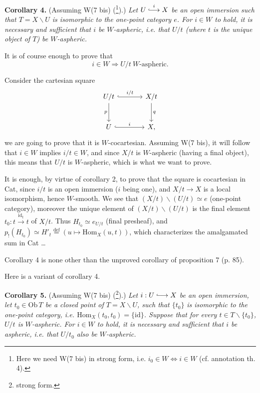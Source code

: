 \documentclass[11pt]{article}
\newcommand{\printedpage}[1]{\marginpar{\footnotesize p.~#1}}
\newcommand{\msp}[1]{\marginpar{\footnotesize [#1]}}
\newcommand{\hto}[1][]{\overset{#1}{\lhook\joinrel\longrightarrow}}
\begin{document}
\printedpage{103}

\noindent\textbf{Corollary 4.} (Assuming W(7 bis) (\footnote[104]{Here we need W(7 bis) in strong form, i.e. $i_0\in W \iff i\in W$ (cf. annotation th. 4).}).) \textit{Let $U \hto[i] X$ be an open immersion such that $T=X\backslash U$ is isomorphic to the one-point category $e$. For $i\in W$ to hold, it is necessary and sufficient that $i$ be $W$-aspheric, i.e. that $U/t$ (where $t$ is the unique object of $T$) be $W$-aspheric.}

It is of course enough to prove that
\[
i\in W \Longrightarrow U/t \ W\text{-aspheric.}
\]

\msp{page 150}
Consider the cartesian square
\[
\begin{tikzcd}[row sep=large,column sep=large]
U/t \arrow[r, hook, "i/t"] \arrow[d, "p"'] & X/t \arrow[d, "q"] \\
U \arrow[r, hook, "i"] & X,
\end{tikzcd}
\]
we are going to prove that it is $W$-cocartesian. Assuming W(7 bis), it will follow that $i\in W$ implies $i/t\in W$, and since $X/t$ is $W$-aspheric (having a final object), this means that $U/t$ is $W$-aspheric, which is what we want to prove.

It is enough, by virtue of corollary 2, to prove that the square is cocartesian in Cat, since $i/t$ is an open immersion ($i$ being one), and $X/t\longrightarrow X$ is a local isomorphism, hence $W$-smooth. We see that $(X/t)\backslash(U/t)\simeq e$ (one-point category), moreover the unique element of $(X/t)\backslash(U/t)$ is the final element $t_0 : t\xrightarrow{\mathrm{id}_t} t$ of $X/t$. Thus $H_{t_0}\simeq e_{U/t}$ (final presheaf), and $p_{!}(H_{t_0})\simeq H'_t \overset{\text{def}}{=} (u\longmapsto \mathrm{Hom}_X(u,t))$, which characterizes the amalgamated sum in Cat
\dots

Corollary 4 is none other than the unproved corollary of proposition 7 (p. 85).

Here is a variant of corollary 4.

\noindent\textbf{Corollary 5.} (Assuming W(7 bis) (\footnote[105]{strong form.}).) \textit{Let $i : U \hto X$ be an open immersion, let $t_0\in\mathrm{Ob}\,T$ be a \textup{closed} point of $T=X\backslash U$, such that $\{t_0\}$}
\msp{page 151}
\textit{is isomorphic to the one-point category, i.e. $\mathrm{Hom}_X(t_0,t_0)=\{\mathrm{id}\}$. Suppose that for every $t\in T\backslash\{t_0\}$, $U/t$ is $W$-aspheric. For $i\in W$ to hold, it is necessary and sufficient that $i$ be aspheric, i.e. that $U/t_0$ also be $W$-aspheric.}
\end{document}
